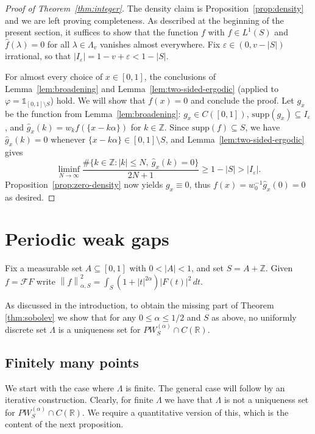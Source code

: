 \documentclass[reqno,a4paper,12pt]{amsart}
\numberwithin{equation}{section}
\def\Z{{\mathbb Z}}
\def\R{{\mathbb R}}
\newcommand{\supp}{{\mathrm{supp}}}
\newcommand\1{\mathds{1}}
\newcommand{\ft}{{\mathcal{F}}}
\newcommand{\norm}[1]{\left\lVert #1 \right\rVert}
\begin{document}
\begin{proof}[Proof of Theorem~\ref{thm:integer}]
The density claim is Proposition~\ref{prop:density} and we are left proving completeness. As described at the beginning of the present section, it suffices to show that the function $f$ with $f\in L^1(S)$ and $\widehat f(\lambda)=0$ for all
$\lambda\in\Lambda_v$ vanishes almost everywhere. Fix
$\varepsilon\in(0,v-|S|)$ irrational, so that
$|I_\varepsilon|=1-v+\varepsilon<1-|S|$.

For almost every choice of $x\in[0,1]$, the conclusions of
Lemma~\ref{lem:broadening} and Lemma~\ref{lem:two-sided-ergodic}
(applied to $\varphi=\1_{[0,1]\setminus S}$) hold.  We will show that $f(x)=0$ and conclude the proof.
Let $g_x$ be the
function from Lemma~\ref{lem:broadening}: $g_x\in C([0,1])$,
$\supp (g_x)\subseteq I_\varepsilon$, and
$\widehat g_x(k)=w_kf(\{x-k\alpha\})$ for $k\in\Z$.  Since $\supp (f) \subseteq S$, we have
$\widehat g_x(k)=0$ whenever $\{x-k\alpha\}\in[0,1]\setminus S$, and
Lemma~\ref{lem:two-sided-ergodic} gives
\[
 \liminf_{N\to\infty}
 \frac{\#\{k\in\Z:|k|\leq N,\ \widehat g_x(k)=0\}}{2N+1}
 \geq 1-|S|>|I_\varepsilon| .
\]
Proposition~\ref{prop:zero-density} now yields $g_x\equiv 0$, thus
$f(x)=w_0^{-1}\widehat g_x(0)=0$ as desired.
\end{proof}


\section{Periodic weak gaps}
\label{sec:sobolev-sharpness}

Fix a measurable set \(A\subseteq[0,1]\) with \(0<|A|<1\), and set
\(S=A+\Z\). Given
\(f=\ft F\) write
\(\norm{f}_{\alpha,S}^2=\int_S(1+|t|^{2\alpha})|F(t)|^2\,dt\).

As discussed in the introduction, to obtain the missing part of Theorem \ref{thm:sobolev} we show that for any \(0\leq\alpha\leq1/2\) and $S$ as above, no uniformly discrete set $\Lambda$ is a uniqueness set for \(PW^{(\alpha)}_S\cap C(\R)\). 

\subsection{Finitely many points}
We start with the case where $\Lambda$ is finite. The general case will follow by an iterative construction. Clearly, for finite $\Lambda$ we have that $\Lambda$ is not a uniqueness set for $PW^{(\alpha)}_S\cap C(\R)$. We require a quantitative version of this, which is the content of the next proposition.
\end{document}
